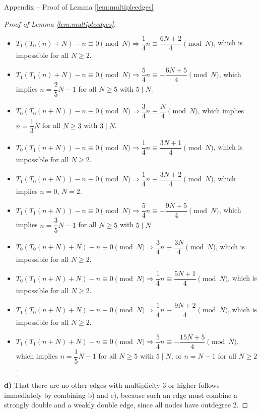 \documentclass[10pt]{article}
\theoremstyle{definition}
\begin{document}
\begin{section}{Appendix -- Proof of Lemma \ref{lem:multipleedges}}
{\begin{proof}[Proof of Lemma \ref{lem:multipleedges}]
\begin{itemize}
            \item $ T_1(T_0(n)+N)   - n \equiv 0 \pmod{N} \Rightarrow
            \dfrac{1}{4} n \equiv \dfrac{6N+2}{4} \pmod{N} $, which is impossible for all $ N \geq 2 $.
            \item $ T_1(T_1(n)+N)   - n \equiv 0 \pmod{N} \Rightarrow
            \dfrac{5}{4} n \equiv - \dfrac{6N+5}{4} \pmod{N} $, which implies $ n = \dfrac{2}{5} N - 1 $
            for all $ N \geq 5 $ with $ 5 \mid N $.
            \item $ T_0(T_0(n+N))   - n \equiv 0 \pmod{N} \Rightarrow
            \dfrac{3}{4} n \equiv \dfrac{N}{4} \pmod{N} $, which implies $ n = \dfrac{1}{3} N $
            for all $ N \geq 3 $ with $ 3 \mid N $.
            \item $ T_0(T_1(n+N))   - n \equiv 0 \pmod{N} \Rightarrow
            \dfrac{1}{4} n \equiv \dfrac{3N+1}{4} \pmod{N} $, which is impossible for all $ N \geq 2 $.
            \item $ T_1(T_0(n+N))   - n \equiv 0 \pmod{N} \Rightarrow
            \dfrac{1}{4} n \equiv \dfrac{3N+2}{4} \pmod{N} $, which implies $ n = 0 $, $ N = 2 $.
            \item $ T_1(T_1(n+N))   - n \equiv 0 \pmod{N} \Rightarrow
            \dfrac{5}{4} n \equiv - \dfrac{9N+5}{4} \pmod{N} $, which implies $ n = \dfrac{3}{5} N - 1 $
            for all $ N \geq 5 $ with $ 5 \mid N $.
            \item $ T_0(T_0(n+N)+N) - n \equiv 0 \pmod{N} \Rightarrow
            \dfrac{3}{4} n \equiv \dfrac{3N}{4} \pmod{N} $, which is impossible for all $ N \geq 2 $.
            \item $ T_0(T_1(n+N)+N) - n \equiv 0 \pmod{N} \Rightarrow
            \dfrac{1}{4} n \equiv \dfrac{5N+1}{4} \pmod{N} $, which is impossible for all $ N \geq 2 $.
            \item $ T_1(T_0(n+N)+N) - n \equiv 0 \pmod{N} \Rightarrow
            \dfrac{1}{4} n \equiv \dfrac{9N+2}{4} \pmod{N} $, which is impossible for all $ N \geq 2 $.
            \item $ T_1(T_1(n+N)+N) - n \equiv 0 \pmod{N} \Rightarrow
            \dfrac{5}{4} n \equiv - \dfrac{15N+5}{4} \pmod{N} $, which implies $ n = \dfrac{1}{5} N - 1 $
            for all $ N \geq 5 $ with $ 5 \mid N $, or $ n = N - 1 $ for all $ N \geq 2 $.
        \end{itemize}
        \textbf{d)} That there are no other edges with multiplicity 3 or higher follows immediately by combining
        b) and c), because such an edge must combine a strongly double and a weakly double edge,
        since all nodes have outdegree $ 2 $.
    \end{proof}
}
\end{section}
\end{document}
